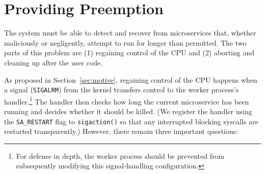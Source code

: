 \section{Providing Preemption}
\label{sec:preemption}

% 
% 



The system must be able to detect and recover from microservices that, whether
maliciously or negligently, attempt to run for longer than permitted.  The two parts
of this problem are (1) regaining control of the CPU and (2) aborting and cleaning up
after the user code.

As proposed in Section~\ref{sec:motive}, regaining control of the CPU happens when a
signal (\texttt{SIGALRM}) from the kernel transfers control to the worker process's
handler.\footnote{For defense in depth, the worker process should be prevented from
subsequently modifying this signal-handling configuration.}  The handler then checks
how long the current microservice has been running
and decides whether it should be killed.  (We register the handler using the
\texttt{SA\_RESTART} flag to \texttt{sigaction()} so that any interrupted blocking
syscalls are restarted transparently.)  However, there remain three important
questions:

